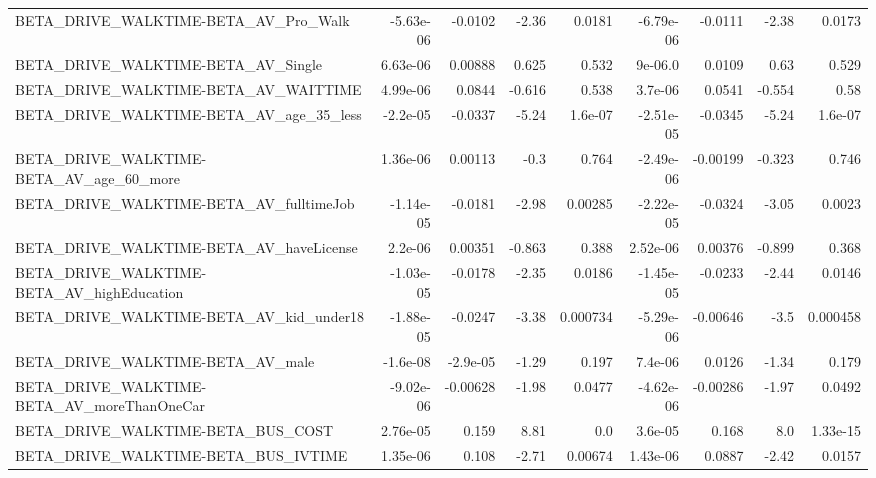 \begin{tabular}{lrrrrrrrr}
BETA\_DRIVE\_WALKTIME-BETA\_AV\_Pro\_Walk               &   -5.63e-06 &      -0.0102 &    -2.36 &   0.0181 &  -6.79e-06 &     -0.0111 &        -2.38 &        0.0173 \\
BETA\_DRIVE\_WALKTIME-BETA\_AV\_Single                 &    6.63e-06 &      0.00888 &    0.625 &    0.532 &    9e-06.0 &      0.0109 &         0.63 &         0.529 \\
BETA\_DRIVE\_WALKTIME-BETA\_AV\_WAITTIME               &    4.99e-06 &       0.0844 &   -0.616 &    0.538 &    3.7e-06 &      0.0541 &       -0.554 &          0.58 \\
BETA\_DRIVE\_WALKTIME-BETA\_AV\_age\_35\_less            &    -2.2e-05 &      -0.0337 &    -5.24 &  1.6e-07 &  -2.51e-05 &     -0.0345 &        -5.24 &       1.6e-07 \\
BETA\_DRIVE\_WALKTIME-BETA\_AV\_age\_60\_more            &    1.36e-06 &      0.00113 &     -0.3 &    0.764 &  -2.49e-06 &    -0.00199 &       -0.323 &         0.746 \\
BETA\_DRIVE\_WALKTIME-BETA\_AV\_fulltimeJob            &   -1.14e-05 &      -0.0181 &    -2.98 &  0.00285 &  -2.22e-05 &     -0.0324 &        -3.05 &        0.0023 \\
BETA\_DRIVE\_WALKTIME-BETA\_AV\_haveLicense            &     2.2e-06 &      0.00351 &   -0.863 &    0.388 &   2.52e-06 &     0.00376 &       -0.899 &         0.368 \\
BETA\_DRIVE\_WALKTIME-BETA\_AV\_highEducation          &   -1.03e-05 &      -0.0178 &    -2.35 &   0.0186 &  -1.45e-05 &     -0.0233 &        -2.44 &        0.0146 \\
BETA\_DRIVE\_WALKTIME-BETA\_AV\_kid\_under18            &   -1.88e-05 &      -0.0247 &    -3.38 & 0.000734 &  -5.29e-06 &    -0.00646 &         -3.5 &      0.000458 \\
BETA\_DRIVE\_WALKTIME-BETA\_AV\_male                   &    -1.6e-08 &     -2.9e-05 &    -1.29 &    0.197 &    7.4e-06 &      0.0126 &        -1.34 &         0.179 \\
BETA\_DRIVE\_WALKTIME-BETA\_AV\_moreThanOneCar         &   -9.02e-06 &     -0.00628 &    -1.98 &   0.0477 &  -4.62e-06 &    -0.00286 &        -1.97 &        0.0492 \\
BETA\_DRIVE\_WALKTIME-BETA\_BUS\_COST                  &    2.76e-05 &        0.159 &     8.81 &      0.0 &    3.6e-05 &       0.168 &          8.0 &      1.33e-15 \\
BETA\_DRIVE\_WALKTIME-BETA\_BUS\_IVTIME                &    1.35e-06 &        0.108 &    -2.71 &  0.00674 &   1.43e-06 &      0.0887 &        -2.42 &        0.0157 \\

\end{tabular}

